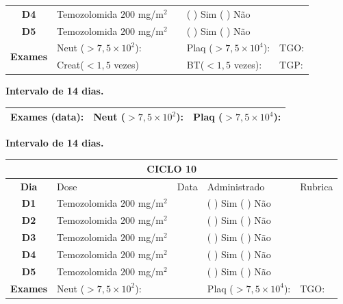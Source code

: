 \documentclass[11pt,a4paper,oldfontcommands]{memoir}
\begin{document}
\begin{center}
\begin{table}[H]
\begin{tabular}{p{1cm}p{5cm}|p{1cm}|p{4.5cm}|p{2cm}}
    \multicolumn{1}{c|}{\multirow{1}{*}{\textbf{D4}}}&{Temozolomida \(200\) mg/m\(^2\)}&&{(  ) Sim (  ) Não}&\\
    \multicolumn{1}{c|}{\multirow{1}{*}{\textbf{D5}}}&{Temozolomida \(200\) mg/m\(^2\)}&&{(  ) Sim (  ) Não}&\\
    \hline
    \multicolumn{1}{c|}{\multirow{2}{*}{\textbf{Exames}}}&\multicolumn{2}{l|}{Neut (\(>7,5\times10^2\)):}&{Plaq (\(>7,5\times10^4\)):}&{TGO:}\\
    \cline{2-5}
    \multicolumn{1}{c|}{\multirow{2}{*}{{}}}&\multicolumn{2}{l|}{Creat(\(<1,5\) vezes)}&{BT(\(<1,5\) vezes):}&{TGP:}
    \\
    \hline
\end{tabular}
\end{table}
\textbf{Intervalo de 14 dias.}
\begin{table}[H]
\begin{tabular}{p{5cm}|p{5cm}|p{4.7cm}}
    \hline
    \textbf{Exames (data):}&{Neut (\(>7,5\times10^2\)):}&{Plaq (\(>7,5\times10^4\)):}
    \\
    \hline
\end{tabular}
\end{table}
\textbf{Intervalo de 14 dias.}
\begin{table}[H]
\begin{tabular}{p{1cm}p{5cm}|p{1cm}|p{4.5cm}|p{2cm}}
	\hline
	\multicolumn{5}{c}{\textbf{CICLO 10}}\\
\hline
    \multicolumn{1}{c|}{\multirow{1}{*}{\textbf{Dia}}}&{Dose}&{Data}&{Administrado}&{Rubrica} \\
    \hline
    \multicolumn{1}{c|}{\multirow{1}{*}{\textbf{D1}}}&{Temozolomida \(200\) mg/m\(^2\)}&&{(  ) Sim (  ) Não}&\\
    \multicolumn{1}{c|}{\multirow{1}{*}{\textbf{D2}}}&{Temozolomida \(200\) mg/m\(^2\)}&&{(  ) Sim (  ) Não}&\\
    \multicolumn{1}{c|}{\multirow{1}{*}{\textbf{D3}}}&{Temozolomida \(200\) mg/m\(^2\)}&&{(  ) Sim (  ) Não}&\\
    \multicolumn{1}{c|}{\multirow{1}{*}{\textbf{D4}}}&{Temozolomida \(200\) mg/m\(^2\)}&&{(  ) Sim (  ) Não}&\\
    \multicolumn{1}{c|}{\multirow{1}{*}{\textbf{D5}}}&{Temozolomida \(200\) mg/m\(^2\)}&&{(  ) Sim (  ) Não}&\\
    \hline
    \multicolumn{1}{c|}{\multirow{2}{*}{\textbf{Exames}}}&\multicolumn{2}{l|}{Neut (\(>7,5\times10^2\)):}&{Plaq (\(>7,5\times10^4\)):}&{TGO:}\\

\end{tabular}
\end{table}
\end{center}
\end{document}
